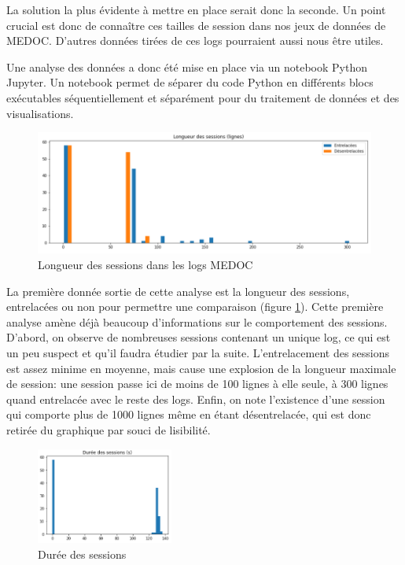 \documentclass[openany, 11pt]{memoir}
\begin{document}
La solution la plus évidente à mettre en place serait donc la seconde. Un point crucial est donc de connaître ces tailles de session dans nos jeux de données de \gls{MEDOC}. D'autres données tirées de ces \glspl{log} pourraient aussi nous être utiles.

\bigskip
Une analyse des données a donc été mise en place via un notebook Python Jupyter. Un notebook permet de séparer du code Python en différents blocs exécutables séquentiellement et séparément pour du traitement de données et des visualisations.

\begin{figure}[ht]
	\centering
	\includegraphics[width=\textwidth]{images/longsess.png}
	\caption{Longueur des sessions dans les logs MEDOC}
	\label{longsess}
\end{figure}

La première donnée sortie de cette analyse est la longueur des sessions, entrelacées ou non pour permettre une comparaison (figure \ref{longsess}). Cette première analyse amène déjà beaucoup d'informations sur le comportement des sessions. D'abord, on observe de nombreuses sessions contenant un unique \gls{log}, ce qui est un peu suspect et qu'il faudra étudier par la suite. L'entrelacement des sessions est assez minime en moyenne, mais cause une explosion de la longueur maximale de session: une session passe ici de moins de 100 lignes à elle seule, à 300 lignes quand entrelacée avec le reste des logs. Enfin, on note l'existence d'une session qui comporte plus de 1000 lignes même en étant désentrelacée, qui est donc retirée du graphique par souci de lisibilité.

\begin{figure}[ht]
	\centering
	\includegraphics[width=0.4\textwidth]{images/dureesess.png}
	\caption{Durée des sessions}
	\label{dureesess}
\end{figure}
\end{document}
